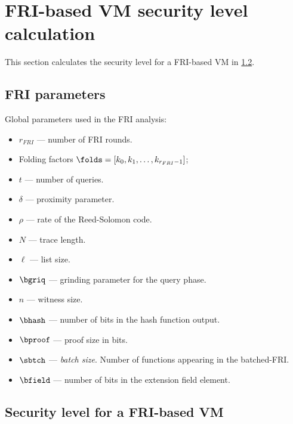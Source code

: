 \newpage
\section{FRI-based VM security level calculation}

This section calculates the security level for a FRI-based VM in \cref{sec:fri_security_level}.

\subsection{FRI parameters}

Global parameters used in the FRI analysis:
\begin{itemize}
    \item $r_{FRI}$ --- number of FRI rounds.
    \item Folding factors $\folds=[k_0,k_1,\ldots,k_{r_{FRI}-1}]$;
    \item $t$ --- number of queries.
    \item $\delta$ --- proximity parameter.
    \item $\rho$ --- rate of the Reed-Solomon code.
    \item $N$ --- trace length.
    \item $\ell$ --- list size.
    \item $\bgriq$ --- grinding parameter for the query phase.
    \item $n$ --- witness size.
    \item $\bhash$ --- number of bits in the hash function output.
    \item $\bproof$ --- proof size in bits.
    \item $\sbtch$ --- \emph{batch size}. Number of functions appearing in the batched-FRI.
    \item $\bfield$ --- number of bits in the extension field element.
\end{itemize}




\subsection{Security level for a FRI-based VM}\label{sec:fri_security_level}

